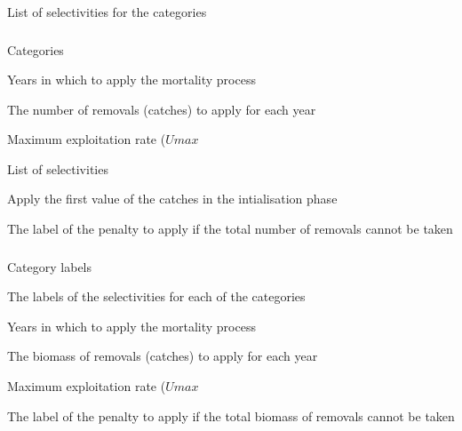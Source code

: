  {List of selectivities for the categories}

\subsubsection[Mortality Event]{}

 {Categories}

 {Years in which to apply the mortality process}

 {The number of removals (catches) to apply for each year}

 {Maximum exploitation rate ($Umax$}

 {List of selectivities}

 {Apply the first value of the catches in the intialisation phase}

 {The label of the penalty to apply if the total number of removals cannot be taken}

\subsubsection[Mortality Event Biomass]{}

 {Category labels}

 {The labels of the selectivities for each of the categories}

 {Years in which to apply the mortality process}

 {The biomass of removals (catches) to apply for each year}

 {Maximum exploitation rate ($Umax$}

 {The label of the penalty to apply if the total biomass of removals cannot be taken}

